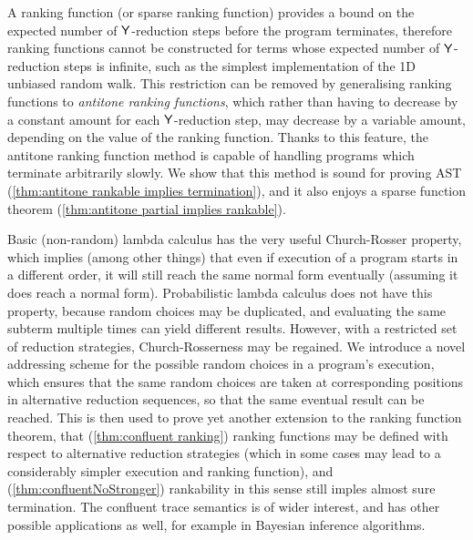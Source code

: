 A ranking function (or sparse ranking function) provides a bound on the expected number of $\mathsf{Y}$-reduction steps before the program terminates, therefore ranking functions cannot be constructed for terms whose expected number of $\mathsf{Y}$-reduction steps is infinite, such as the simplest implementation of the 1D unbiased random walk. 
This restriction can be removed by generalising ranking functions to \emph{antitone ranking functions}, which rather than having to decrease by a constant amount for each $\mathsf{Y}$-reduction step, may decrease by a variable amount, depending on the value of the ranking function. 
Thanks to this feature, the antitone ranking function method is capable of handling programs which terminate arbitrarily slowly. 
We show that this method is sound for proving AST (\cref{thm:antitone rankable implies termination}), 
and it also enjoys a sparse function theorem (\cref{thm:antitone partial implies rankable}).

Basic (non-random) lambda calculus has the very useful Church-Rosser property, which implies (among other things) that even if execution of a program starts in a different order, it will still reach the same normal form eventually (assuming it does reach a normal form). 
Probabilistic lambda calculus does not have this property, because random choices may be duplicated, and evaluating the same subterm multiple times can yield different results. 
However, with a restricted set of reduction strategies, Church-Rosserness may be regained. 
We introduce a novel addressing scheme for the possible random choices in a program's execution, which ensures that the same random choices are taken at corresponding positions in alternative reduction sequences, so that the same eventual result can be reached. 
This is then used to prove yet another extension to the ranking function theorem, that (\cref{thm:confluent ranking}) ranking functions may be defined with respect to alternative reduction strategies (which in some cases may lead to a considerably simpler execution and ranking function), and (\cref{thm:confluentNoStronger}) rankability in this sense still imples almost sure termination. 
The confluent trace semantics is of wider interest, and has other possible applications as well, for example in Bayesian inference algorithms.

